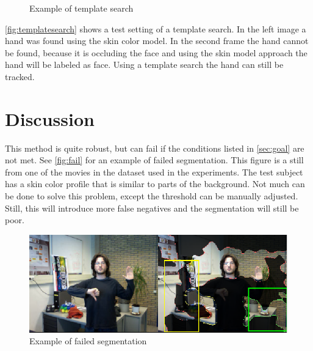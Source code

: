 \begin{figure}[htbp]
\begin{center}
\hspace{0.03\linewidth}
\end{center}
\caption{Example of template search}
\label{fig:templatesearch}
\end{figure}

\autoref{fig:templatesearch} shows a test setting of a template search. In the left image a hand was found using the skin color model. In the second frame the hand cannot be found, because it is occluding the face and using the skin model approach the hand will be labeled as face. Using a template search the hand can still be tracked.


\section{Discussion}
This method is quite robust, but can fail if the conditions listed in \autoref{sec:goal} are not met. See \autoref{fig:fail} for an example of failed segmentation. This figure is a still from one of the movies in the dataset used in the experiments. The test subject has a skin color profile that is similar to parts of the background. Not much can be done to solve this problem, except the threshold can be manually adjusted. Still, this will introduce more false negatives and the segmentation will still be poor.

\begin{figure}[htbp]
\center{}
\includegraphics[width=0.8\linewidth]{figures/fail.png}
\caption{Example of failed segmentation}
\label{fig:fail}
\end{figure}

